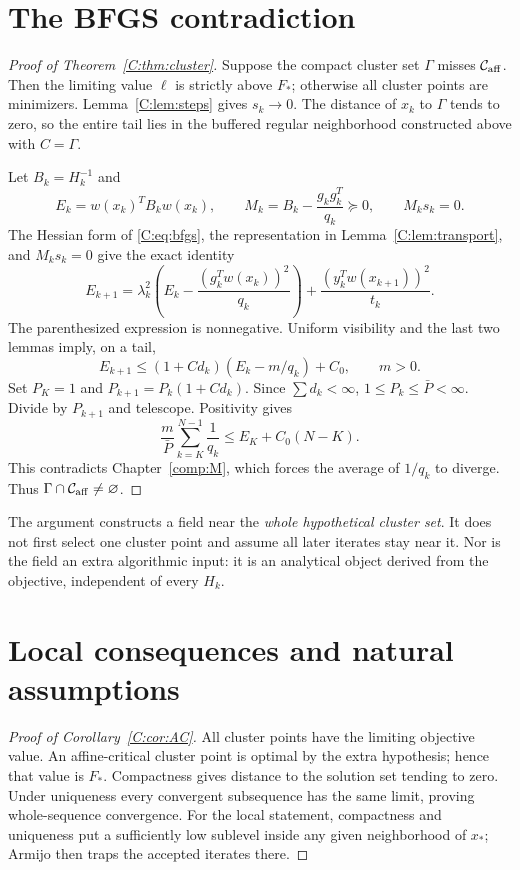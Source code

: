 \section{The BFGS contradiction}
\begin{proof}[Proof of Theorem~\ref{C:thm:cluster}]
Suppose the compact cluster set $\Gamma$ misses $\mathcal C_{\rm aff}$. Then the limiting value $\ell$ is strictly above $F_*$; otherwise all cluster points are minimizers. Lemma~\ref{C:lem:steps} gives $s_k\to0$. The distance of $x_k$ to $\Gamma$ tends to zero, so the entire tail lies in the buffered regular neighborhood constructed above with $C=\Gamma$.

Let $B_k=H_k^{-1}$ and
\[
 E_k=w(x_k)^TB_kw(x_k),\qquad
 M_k=B_k-\frac{g_kg_k^T}{q_k}\succeq0,\qquad M_ks_k=0.
\]
The Hessian form of \eqref{C:eq:bfgs}, the representation in Lemma~\ref{C:lem:transport}, and $M_ks_k=0$ give the exact identity
\begin{equation}\label{C:eq:energy}
 E_{k+1}=\lambda_k^2\left(E_k-\frac{(g_k^Tw(x_k))^2}{q_k}\right)
       +\frac{(y_k^Tw(x_{k+1}))^2}{t_k}.
\end{equation}
The parenthesized expression is nonnegative. Uniform visibility and the last two lemmas imply, on a tail,
\[
 E_{k+1}\le (1+C d_k)(E_k-m/q_k)+C_0,
 \qquad m>0.
\]
Set $P_K=1$ and $P_{k+1}=P_k(1+Cd_k)$. Since $\sum d_k<\infty$, $1\le P_k\le\bar P<\infty$. Divide by $P_{k+1}$ and telescope. Positivity gives
\[
 \frac{m}{\bar P}\sum_{k=K}^{N-1}\frac1{q_k}
 \le E_K+C_0(N-K).
\]
This contradicts Chapter~\ref{comp:M}, which forces the average of $1/q_k$ to diverge. Thus $\Gamma\cap\mathcal C_{\rm aff}\ne\varnothing$.
\end{proof}

The argument constructs a field near the \emph{whole hypothetical cluster set}. It does not first select one cluster point and assume all later iterates stay near it. Nor is the field an extra algorithmic input: it is an analytical object derived from the objective, independent of every $H_k$.


\setcounter{section}{6}
\setcounter{theorem}{7}
\setcounter{equation}{16}


\section{Local consequences and natural assumptions}

\begin{proof}[Proof of Corollary~\ref{C:cor:AC}]
All cluster points have the limiting objective value. An affine-critical cluster point is optimal by the extra hypothesis; hence that value is $F_*$. Compactness gives distance to the solution set tending to zero. Under uniqueness every convergent subsequence has the same limit, proving whole-sequence convergence. For the local statement, compactness and uniqueness put a sufficiently low sublevel inside any given neighborhood of $x_*$; Armijo then traps the accepted iterates there.
\end{proof}

